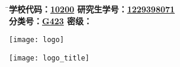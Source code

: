 %
\thispagestyle{empty}
\cleardoublepage

% 


\begin{tabbing}
  
\hspace{3em}

\= \textbf{\songti  学校代码：\underline{10200} \hspace{10em} \songti 研究生学号：\underline{1229398071} } \\[-1.5mm]

\>\textbf{\songti 分\hspace{0.65em}类\hspace{0.65em}号：\underline{G423} \hspace{10em} \songti 密\hspace{3em}级： }\\[-1.5mm]
\end{tabbing}

%
\vspace{-7mm}
\begin{center}
   \texttt{[image: logo]}
\end{center}
%


\vspace{-4mm}
%
\begin{center}
  \texttt{[image: logo\_title]}
\end{center}


\vspace{-2mm}
\centerline{}
%
\vspace{17mm}

\begin{center}
  \begin{spacing}{1}
   \heiti \textbf{\nstitlec}
  \end{spacing}
\end{center}
\vspace{-7.5ex}
\begin{center}
  \begin{spacing}{1.5}
   \textbf{\nstitlee}
  \end{spacing}
\end{center}



